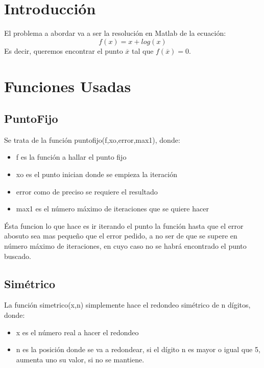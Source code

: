 \documentclass[a4paper]{article}
\title{}
\author{}
\date{}
\begin{document}
\maketitle

\tableofcontents
\clearpage

\section{Introducción}
El problema a abordar va a ser la resolución en Matlab de la ecuación:
\begin{equation}
f(x)=x+log(x)
\end{equation}
Es decir, queremos encontrar el punto $\overline{x}$ tal que $f(\overline{x})=0$.

\section{Funciones Usadas}
\subsection{PuntoFijo}
Se trata de la función puntofijo(f,xo,error,max1), donde:
\begin{itemize}
\item f es la función a hallar el punto fijo
\item xo es el punto inician donde se empieza la iteración
\item error como de preciso se requiere el resultado
\item max1 es el número máximo de iteraciones que se quiere hacer
\end{itemize}
Ésta funcion lo que hace es ir iterando el punto la función hasta que el error abosuto sea mas pequeño que el error pedido, a no ser de que se supere en número máximo de iteraciones, en cuyo caso no se habrá encontrado el punto buscado.
\subsection{Simétrico}
La función simetrico(x,n) simplemente hace el redondeo simétrico de n dígitos, donde:
\begin{itemize}
\item x es el número real a hacer el redondeo
\item n es la posición donde se va a redondear, si el dígito n es mayor o igual que 5, aumenta uno su valor, si no se mantiene.
\end{itemize}
\end{document}
